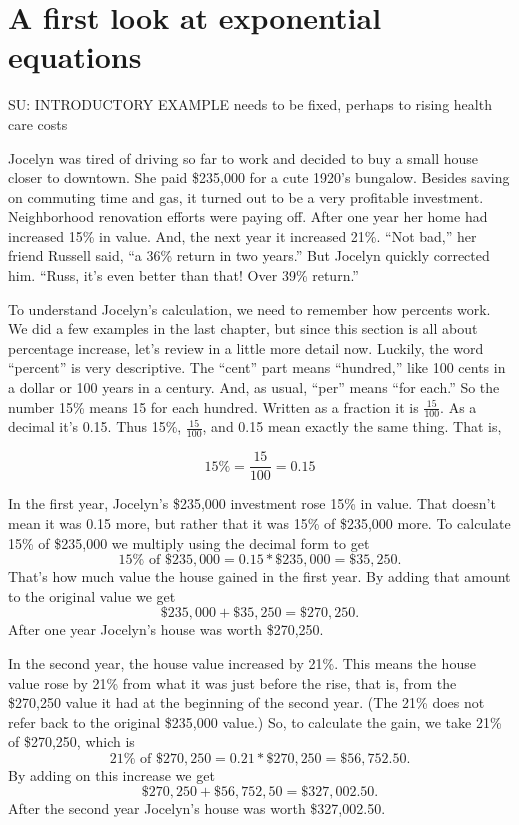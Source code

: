 

\section{A first look at exponential equations}

SU:  INTRODUCTORY EXAMPLE needs to be fixed, perhaps to rising health care costs

Jocelyn was tired of driving so far to work and decided to buy a small house closer to downtown.  She paid \$235,000 for a cute 1920's bungalow.  Besides saving on commuting time and gas, it turned out to be a very profitable investment.  Neighborhood renovation efforts were paying off.  After one year her home had increased 15\% in value.  And, the next year it increased 21\%.  ``Not bad,'' her friend Russell said, ``a 36\% return in two years.''  But Jocelyn quickly corrected him.  ``Russ, it's even better than that!  Over 39\% return.''

To understand Jocelyn's calculation, we need to remember how percents work.  We did a few examples in the last chapter, but since this section is all about percentage increase, let's review in a little more detail now.  Luckily, the word ``percent'' is very descriptive.  The ``cent'' part means ``hundred,'' like 100 cents in a dollar or 100 years in a century.  And, as usual, ``per'' means ``for each.''  So the number 15\% means 15 for each hundred.  Written as a fraction it is $\frac{15}{100}$.  As a decimal it's 0.15.  Thus 15\%, $\frac{15}{100}$, and 0.15 mean exactly the same thing. That is,

$$15\% = \frac{15}{100} = 0.15$$

In the first year, Jocelyn's \$235,000 investment rose 15\% in value.  That doesn't mean it was 0.15 more, but rather that it was 15\% of \$235,000 more.  To calculate 15\% of \$235,000 we multiply using the decimal form to get $$15\% \text{ of } \$235,000 = 0.15 \ast \$235,000 = \$35,250.$$  That's how much value the house gained in the first year.  By adding that amount to the original value we get $$\$235,000 + \$35,250 = \$270,250.$$  After one year Jocelyn's house was worth \$270,250.

In the second year, the house value increased by 21\%.  This means the house value rose by 21\% from what it was just before the rise, that is, from the \$270,250 value it had at the beginning of the second year.  (The 21\% does not refer back to the original \$235,000 value.)  So, to calculate the gain, we take 21\% of \$270,250, which is $$21\% \text{ of } \$270,250 = 0.21 \ast \$270,250 = \$56,752.50.$$  By adding on this increase we get $$\$270,250 + \$56,752,50 = \$327,002.50.$$  After the second year Jocelyn's house was worth \$327,002.50.

